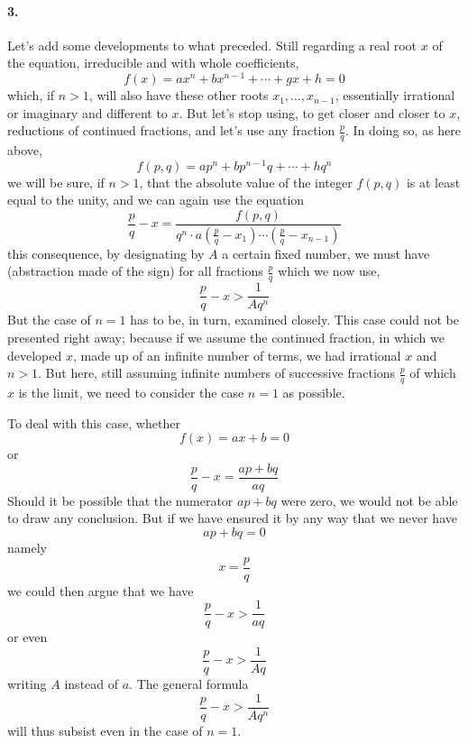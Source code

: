 \documentclass{article}
\begin{document}
\paragraph{3.}
Let’s add some developments to what preceded. Still regarding a real root $x$ of
the equation, irreducible and with whole coefficients,
  $$f(x)=ax^n + bx^{n-1} + \cdots + gx + h = 0$$
which, if $n>1$, will also have these other roots $x_1, \ldots, x_{n-1}$,
essentially irrational or imaginary and different to $x$. But let’s stop using,
to get closer and closer to $x$, reductions of continued fractions, and let’s
use any fraction $\frac{p}{q}$. In doing so, as here above,
  $$f(p,q) = ap^n + bp^{n-1} q + \cdots + hq^n$$
we will be sure, if $n>1$, that the absolute value of the integer $f(p,q)$ is
at least equal to the unity, and we can again use the equation
  $$\frac{p}{q} - x = \frac{f(p, q)}{q^n\cdot a\left(\frac{p}{q} - x_1\right)
  \cdots\left(\frac{p}{q}- x_{n-1}\right)}$$
this consequence, by designating by $A$ a certain fixed number, we must have
(abstraction made of the sign) for all fractions $\frac{p}{q}$ which we now use,
  $$\frac{p}{q} - x > \frac{1}{Aq^n}$$
But the case of $n=1$ has to be, in turn, examined closely. This case could not
be presented right away; because if we assume the continued fraction, in which
we developed $x$, made up of an infinite number of terms, we had irrational $x$
and $n > 1$. But here, still assuming infinite numbers of successive fractions
$\frac{p}{q}$ of which $x$ is the limit, we need to consider the case $n = 1$
as possible.

To deal with this case, whether
  $$f(x) = ax + b = 0$$
or
  $$\frac{p}{q} - x = \frac{ap + bq}{aq}$$
Should it be possible that the numerator $ap + bq$ were zero, we would not be
able to draw any conclusion. But if we have ensured it by any way that we never
have
  $$ap + bq = 0$$
namely
  $$x = \frac{p}{q}$$
we could then argue that we have
  $$\frac{p}{q} - x > \frac{1}{aq}$$
or even
  $$\frac{p}{q} - x > \frac{1}{Aq}$$
writing $A$ instead of $a$. The general formula
  $$\frac{p}{q} - x > \frac{1}{Aq^n}$$
will thus subsist even in the case of $n=1$.
\end{document}
